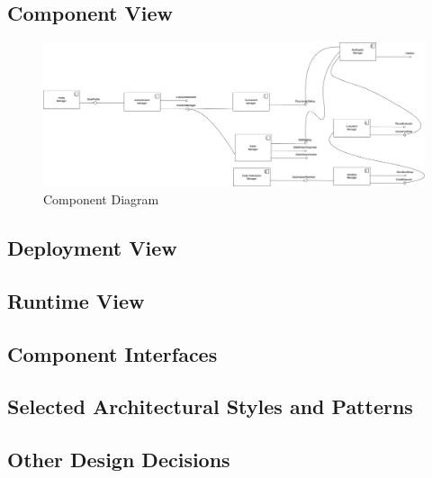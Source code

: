 \subsection{Component View}

\begin{figure}[H]
    \centering
    \includegraphics[width=\linewidth]{Images/DD-component.drawio.png}
    \caption{Component Diagram}
\end{figure}




\subsection{Deployment View}






\subsection{Runtime View}




\subsection{Component Interfaces}



\subsection{Selected Architectural Styles and Patterns}




\subsection{Other Design Decisions}


